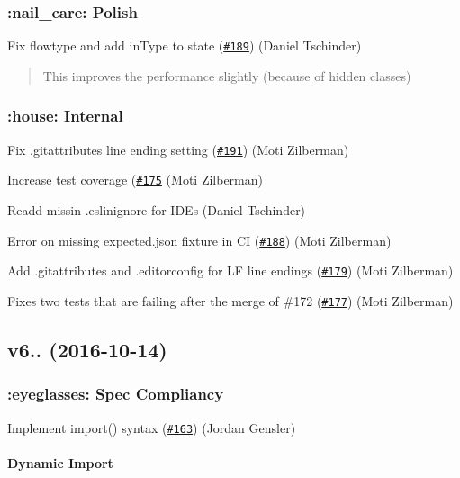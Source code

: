 \subsubsection*{\+:nail\+\_\+care\+: Polish}

Fix flowtype and add in\+Type to state (\href{https://github.com/babel/babylon/pull/189}{\tt \#189}) (Daniel Tschinder)

\begin{quote}
This improves the performance slightly (because of hidden classes) \end{quote}


\subsubsection*{\+:house\+: Internal}

Fix .gitattributes line ending setting (\href{https://github.com/babel/babylon/pull/191}{\tt \#191}) (Moti Zilberman)

Increase test coverage (\href{https://github.com/babel/babylon/pull/175}{\tt \#175} (Moti Zilberman)

Readd missin .eslinignore for I\+D\+Es (Daniel Tschinder)

Error on missing expected.\+json fixture in CI (\href{https://github.com/babel/babylon/pull/188}{\tt \#188}) (Moti Zilberman)

Add .gitattributes and .editorconfig for LF line endings (\href{https://github.com/babel/babylon/pull/179}{\tt \#179}) (Moti Zilberman)

Fixes two tests that are failing after the merge of \#172 (\href{https://github.com/babel/babylon/pull/177}{\tt \#177}) (Moti Zilberman)

\subsection*{v6.. (2016-\/10-\/14)}

\subsubsection*{\+:eyeglasses\+: Spec Compliancy}

Implement import() syntax (\href{https://github.com/babel/babylon/pull/163}{\tt \#163}) (Jordan Gensler)

\paragraph*{Dynamic Import}


